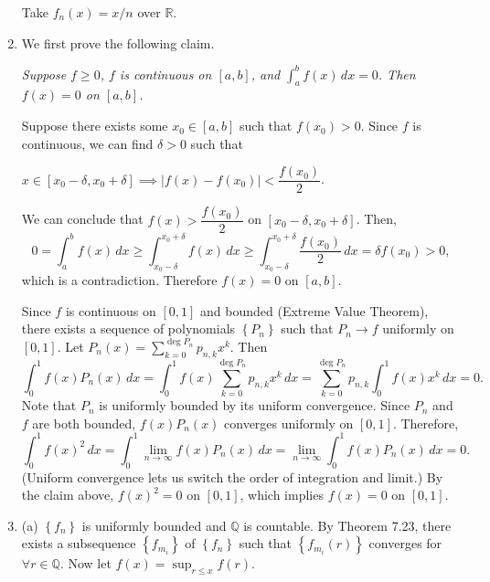 \documentclass[12pt]{report}
\newcommand{\numl}[1]{\item[\large\textbf{\sffamily #1.}]}
\newcommand{\ds}{\displaystyle}
\newcommand{\abs}[1]{\left| #1 \right|}
\newcommand{\seq}[1]{\left\{ #1 \right\}}
\newcommand{\ra}{\rightarrow}
\newcommand{\R}{\mathbb{R}}
\newcommand{\Q}{\mathbb{Q}}
\renewcommand{\d}[1]{\,d{#1}}
\begin{document}
\begin{enumerate}
     Take \(f_n(x) = x/n\) over \(\R\).

    \pagebreak

    \numl{3} We first prove the following claim.

     \textit{Suppose \(f \geq 0\), \(f\) is continuous on \([a, b]\), and \(\ds\int_a^b f(x)\d{x} = 0\). Then \(f(x) = 0\) on \([a, b]\).}

     Suppose there exists some \(x_0 \in [a, b]\) such that \(f(x_0) > 0\). Since \(f\) is continuous, we can find \(\delta > 0\) such that
    \begin{center}
        \(x \in [x_0 - \delta, x_0 + \delta] \implies \abs{f(x) - f(x_0)} < \dfrac{f(x_0)}{2}\).
    \end{center}
    We can conclude that \(f(x) > \dfrac{f(x_0)}{2}\) on \([x_0 - \delta, x_0 + \delta]\). Then,
    \[
        0 = \int_a^b f(x)\d{x} \geq \int_{x_0-\delta}^{x_0+\delta} f(x)\d{x} \geq \int_{x_0-\delta}^{x_0+\delta} \frac{f(x_0)}{2}\d{x} = \delta f(x_0) > 0,
    \]
    which is a contradiction. Therefore \(f(x) = 0\) on \([a, b]\).

    \medskip

    Since \(f\) is continuous on \([0, 1]\) and bounded (Extreme Value Theorem), there exists a sequence of polynomials \(\seq{P_n}\) such that \(P_n \ra f\) uniformly on \([0, 1]\). Let \(P_n(x) = \sum_{k=0}^{\deg P_n} p_{n, k} x^k\). Then
    \[
        \int_0^1 f(x)P_n(x) \d{x} = \int_0^1 f(x)\sum_{k=0}^{\deg P_n} p_{n, k} x^k \d{x} = \sum_{k=0}^{\deg P_n} p_{n, k} \int_0^1 f(x) x^k \d{x} = 0.
    \]
    Note that \(P_n\) is uniformly bounded by its uniform convergence. Since \(P_n\) and \(f\) are both bounded, \(f(x)P_n(x)\) converges uniformly on \([0, 1]\). Therefore,
    \[
        \int_0^1 f(x)^2 \d{x} = \int_0^1 \lim_{n \ra \infty} f(x) P_n(x) \d{x} = \lim_{n\ra\infty} \int_0^1 f(x)P_n(x) \d{x} = 0.
    \]
    (Uniform convergence lets us switch the order of integration and limit.) By the claim above, \(f(x)^2 = 0\) on \([0, 1]\), which implies \(f(x) = 0\) on \([0, 1]\).

    \numl{4} {\sffamily (a)} \(\seq{f_n}\) is uniformly bounded and \(\Q\) is countable. By {\sffamily Theorem 7.23}, there exists a subsequence \(\seq{f_{m_i}}\) of \(\seq{f_n}\) such that \(\seq{f_{m_i}(r)}\) converges for \(\forall r \in \Q\). Now let \(f(x) = \ds \sup_{r \leq x} f(r)\).


\end{enumerate}
\end{document}

